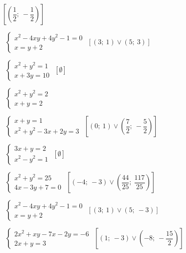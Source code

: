 \begin{esercizio}[\Ast]
\begin{multicols}{2}
\begin{enumeratea}
\hfill\(\left[\left(\dfrac 1 2;~-\dfrac 1 2\right)\right]\)
 \item~\(\left\{\begin{array}{l}x^2-4xy+4y^2-1=0\\x=y+2\end{array}\right.\)
\hfill\(\left[\left(3;~1\right)\vee \left(5;~3\right)\right]\)
 \item~\(\left\{\begin{array}{l}x^2+y^2=1\\x+3y=10\end{array}\right.\)
\hfill\(\left[\emptyset\right]\)
 \item~\(\left\{\begin{array}{l}x^2+y^2=2\\x+y=2\end{array}\right.\)
 \item~\(\left\{\begin{array}{l}x+y=1\\x^2+y^2-3x+2y=3\end{array}\right.\)
\hfill\(\left[\left(0;~1\right)\vee \left(\dfrac 7 2;~-\dfrac 5 
2\right)\right]\)
 \item~\(\left\{\begin{array}{l}3x+y=2\\x^2-y^2=1\end{array}\right.\)
\hfill\(\left[\emptyset\right]\)
 \item~\(\left\{\begin{array}{l}x^2+y^2=25\\4x-3y+7=0\end{array}\right.\)
\hfill\(\left[\left(-4;~-3\right) \vee 
       \left(\dfrac{44}{25};~\dfrac{117}{25}\right)\right]\)
 \item~\(\left\{\begin{array}{l}x^2-4xy+4y^2-1=0\\x=y+2\end{array}\right.\)
\hfill\(\left[\left(3;~1\right)\vee \left(5;~-3\right)\right]\)
 \item~\(\left\{\begin{array}{l}2x^2+xy-7x-2y=-6\\2x+y=3\end{array}\right.\)
\hfill\(\left[\left(1;~-3\right)\vee \left(-8;~-\dfrac{15} 2\right)\right]\)
 \end{enumeratea}
 \end{multicols}
\end{esercizio}

